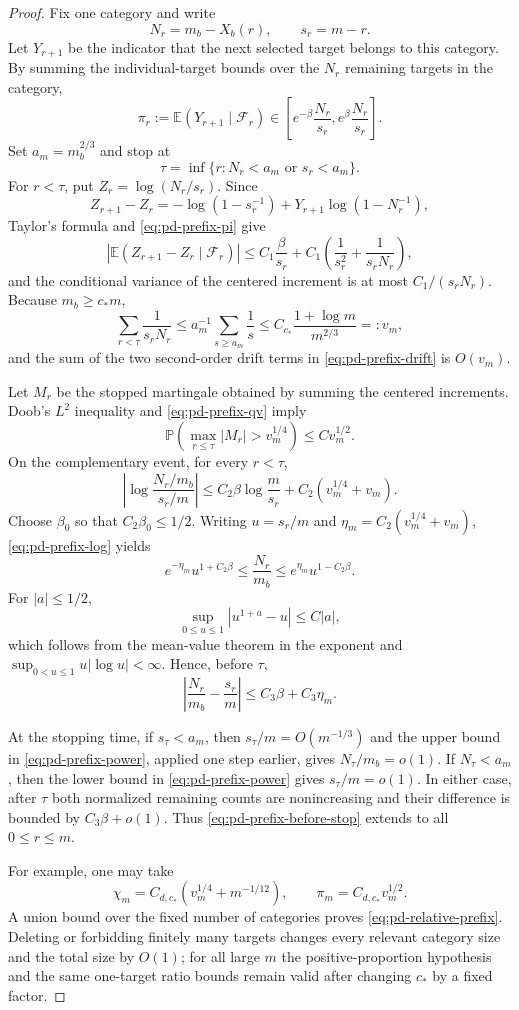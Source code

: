 \documentclass[11pt]{article}
\theoremstyle{remark}
\newcommand{\Pp}{\mathbb P}
\newcommand{\Ee}{\mathbb E}
\begin{document}
\begin{proof}
Fix one category and write
\[
        N_r=m_b-X_b(r),\qquad s_r=m-r.
\]
Let $Y_{r+1}$ be the indicator that the next selected target belongs to this
category.  By summing the individual-target bounds over the $N_r$ remaining
targets in the category,
\[
 \pi_r:=\Ee(Y_{r+1}\mid\mathscr F_r)
 \in\left[e^{-\beta}\frac{N_r}{s_r},
          e^\beta\frac{N_r}{s_r}\right].
 \tag{6.6}\label{eq:pd-prefix-pi}
\]
Set $a_m=m_b^{2/3}$ and stop at
\[
        \tau=\inf\{r:N_r<a_m\text{ or }s_r<a_m\}.
\]
For $r<\tau$, put $Z_r=\log(N_r/s_r)$.  Since
\[
 Z_{r+1}-Z_r
 =-\log(1-s_r^{-1})
  +Y_{r+1}\log(1-N_r^{-1}),
\]
Taylor's formula and \eqref{eq:pd-prefix-pi} give
\[
 \left|\Ee(Z_{r+1}-Z_r\mid\mathscr F_r)\right|
 \le C_1\frac\beta{s_r}
 +C_1\left(\frac1{s_r^2}+\frac1{s_rN_r}\right),
 \tag{6.7}\label{eq:pd-prefix-drift}
\]
and the conditional variance of the centered increment is at most
$C_1/(s_rN_r)$.  Because $m_b\ge c_*m$,
\[
 \sum_{r<\tau}\frac1{s_rN_r}
 \le a_m^{-1}\sum_{s\ge a_m}\frac1s
 \le C_{c_*}\frac{1+\log m}{m^{2/3}}=:v_m,
 \tag{6.8}\label{eq:pd-prefix-qv}
\]
and the sum of the two second-order drift terms in
\eqref{eq:pd-prefix-drift} is $O(v_m)$.

Let $M_r$ be the stopped martingale obtained by summing the centered
increments.  Doob's $L^2$ inequality and \eqref{eq:pd-prefix-qv} imply
\[
 \Pp\left(\max_{r\le\tau}|M_r|>v_m^{1/4}\right)
 \le C v_m^{1/2}.
 \tag{6.9}\label{eq:pd-prefix-doob}
\]
On the complementary event, for every $r<\tau$,
\[
 \left|\log\frac{N_r/m_b}{s_r/m}\right|
 \le C_2\beta\log\frac m{s_r}+C_2(v_m^{1/4}+v_m).
 \tag{6.10}\label{eq:pd-prefix-log}
\]
Choose $\beta_0$ so that $C_2\beta_0\le1/2$.  Writing $u=s_r/m$ and
$\eta_m=C_2(v_m^{1/4}+v_m)$, \eqref{eq:pd-prefix-log} yields
\[
 e^{-\eta_m}u^{1+C_2\beta}
 \le\frac{N_r}{m_b}
 \le e^{\eta_m}u^{1-C_2\beta}.
 \tag{6.11}\label{eq:pd-prefix-power}
\]
For $|a|\le1/2$,
\[
        \sup_{0\le u\le1}|u^{1+a}-u|\le C|a|,
\]
which follows from the mean-value theorem in the exponent and
$\sup_{0<u\le1}u|\log u|<\infty$.  Hence, before $\tau$,
\[
        \left|\frac{N_r}{m_b}-\frac{s_r}{m}\right|
        \le C_3\beta+C_3\eta_m.
 \tag{6.12}\label{eq:pd-prefix-before-stop}
\]

At the stopping time, if $s_\tau<a_m$, then
$s_\tau/m=O(m^{-1/3})$ and the upper bound in
\eqref{eq:pd-prefix-power}, applied one step earlier, gives
$N_\tau/m_b=o(1)$.  If $N_\tau<a_m$, then the lower bound in
\eqref{eq:pd-prefix-power} gives $s_\tau/m=o(1)$.  In either case, after
$\tau$ both normalized remaining counts are nonincreasing and their difference
is bounded by $C_3\beta+o(1)$.  Thus
\eqref{eq:pd-prefix-before-stop} extends to all $0\le r\le m$.

For example, one may take
\[
 \chi_m=C_{d,c_*}\left(v_m^{1/4}+m^{-1/12}\right),
 \qquad
 \pi_m=C_{d,c_*}v_m^{1/2}.
\]
A union bound over the fixed number of categories proves
\eqref{eq:pd-relative-prefix}.  Deleting or forbidding finitely many targets
changes every relevant category size and the total size by $O(1)$; for all
large $m$ the positive-proportion hypothesis and the same one-target ratio
bounds remain valid after changing $c_*$ by a fixed factor.
\end{proof}
\end{document}
